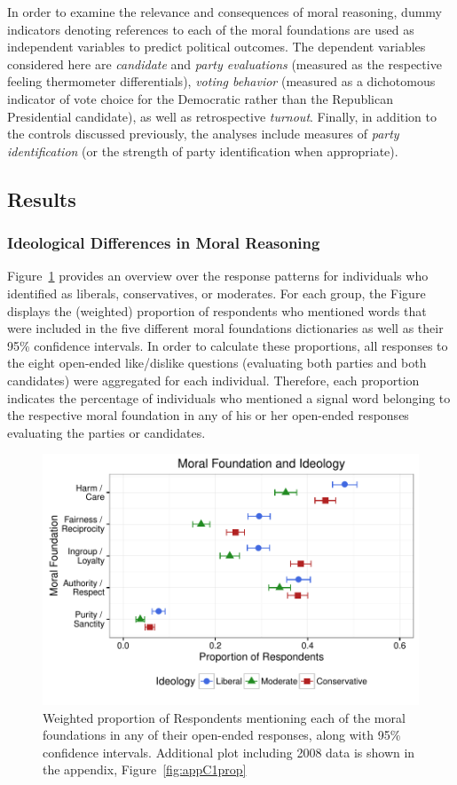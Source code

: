 \documentclass[12pt]{article}
\begin{document}
In order to examine the relevance and consequences of moral reasoning, dummy indicators denoting references to each of the moral foundations are used as independent variables to predict political outcomes. The dependent variables considered here are \textit{candidate} and \textit{party evaluations} (measured as the respective feeling thermometer differentials), \textit{voting behavior} (measured as a dichotomous indicator of vote choice for the Democratic rather than the Republican Presidential candidate), as well as retrospective \textit{turnout}. Finally, in addition to the controls discussed previously, the analyses include measures of \textit{party identification} (or the strength of party identification when appropriate).


\subsection{Results}

\subsubsection{Ideological Differences in Moral Reasoning}

Figure~\ref{fig:1prop} provides an overview over the response patterns for individuals who identified as liberals, conservatives, or moderates. For each group, the Figure displays the (weighted) proportion of respondents who mentioned words that were included in the five different moral foundations dictionaries as well as their 95\% confidence intervals. In order to calculate these proportions, all responses to the eight open-ended like/dislike questions (evaluating both parties and both candidates) were aggregated for each individual. Therefore, each proportion indicates the percentage of individuals who mentioned a signal word belonging to the respective moral foundation in any of his or her open-ended responses evaluating the parties or candidates.

\begin{figure}[h]\centering
\includegraphics[scale=.9]{../calc/fig/fig1prop.pdf}
\caption{Weighted proportion of Respondents mentioning each of the moral foundations in any of their open-ended responses, along with 95\% confidence intervals. Additional plot including 2008 data is shown in the appendix, Figure~\ref{fig:appC1prop}}\label{fig:1prop}
\end{figure}
\end{document}
